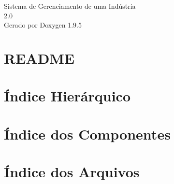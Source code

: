 \documentclass[twoside]{book}
\newcommand{\+}{\discretionary{\mbox{\scriptsize$\hookleftarrow$}}{}{}}
\newcommand{\clearemptydoublepage}{%
    \newpage{\pagestyle{empty}\cleardoublepage}%
  }
\begin{document}
  \raggedbottom
    \hypersetup{pageanchor=false,
                bookmarksnumbered=true,
                pdfencoding=unicode
               }
  \begin{titlepage}
  \vspace*{7cm}
  \begin{center}%
  {\Large Sistema de Gerenciamento de uma Indústria}\\
  [1ex]\large 2.\+0 \\
  \vspace*{1cm}
  {\large Gerado por Doxygen 1.9.5}\\
  \end{center}
  \end{titlepage}
  \clearemptydoublepage
  \tableofcontents
  \clearemptydoublepage
  \hypersetup{pageanchor=true}
\chapter{README}
\label{md__c___users_felip__one_drive__documentos__git_hub_poo__r_e_a_d_m_e}

\chapter{Índice Hierárquico}

\chapter{Índice dos Componentes}

\chapter{Índice dos Arquivos}

\end{document}
